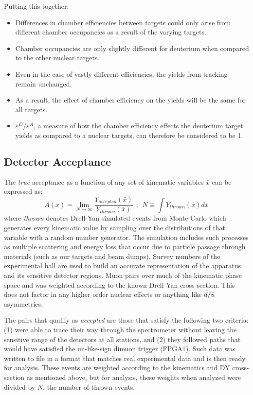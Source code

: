 Putting this together:
\begin{itemize}
	\item Differences in chamber efficiencies between targets could only arise from different chamber occupancies as a result of the varying targets.
	\item Chamber occupancies are only slightly different for deuterium when compared to the other nuclear targets.
	\item Even in the case of vastly different efficiencies, the yields from tracking remain unchanged.
	\item As a result, the effect of chamber efficiency on the yields will be the same for all targets.
	\item $\varepsilon^D/\varepsilon^A$, a measure of how the chamber efficiency effects the deuterium target yields as compared to a nuclear targets, can therefore be considered to be 1.
\end{itemize}

\subsection{Detector Acceptance}

The \emph{true} acceptance as a function of any set of kinematic variables $\bar{x}$ can be expressed as:
\begin{equation}
A(x) = \lim\limits_{N\rightarrow \infty} \frac{Y_{accepted}(\bar{x})}{Y_{thrown} (\bar{x})}\ \ ;\ \ 
N \equiv \int Y_{thrown}(\bar{x}) dx
\end{equation}
where \emph{thrown} denotes Drell-Yan simulated events from Monte Carlo which generates every kinematic value by sampling over the distributions of that variable with a random number generator. The simulation includes such processes as multiple scattering and energy loss that occur due to particle passage through materials (such as our targets and beam dumps). Survey numbers of the experimental hall are used to build an accurate representation of the apparatus and its sensitive detector regions. Muon pairs over much of the kinematic phase space and was weighted according to the known Drell-Yan cross section. This does not factor in any higher order nuclear effects or anything like $\bar{d}/\bar{u}$ asymmetries. 

The pairs that qualify as \emph{accepted} are those that satisfy the following two criteria: (1) were able to trace their way through the spectrometer without leaving the sensitive range of the detectors at all stations, and (2) they followed paths that would have satisfied the un-like-sign dimuon trigger (FPGA1). Such data was written to file in a format that matches real experimental data and is then ready for analysis. These events are weighted according to the kinematics and DY cross-section as mentioned above, but for analysis, these weights when analyzed were divided by $N$, the number of thrown events.

